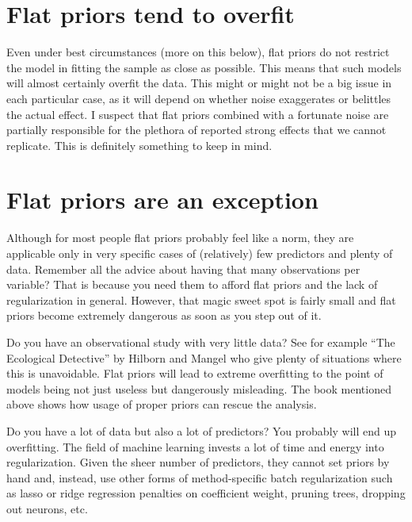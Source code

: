 \documentclass[
]{book}
\begin{document}
\hypertarget{flat-priors-tend-to-overfit}{%
\section{Flat priors tend to overfit}\label{flat-priors-tend-to-overfit}}

Even under best circumstances (more on this below), flat priors do not restrict the model in fitting the sample as close as possible. This means that such models will almost certainly overfit the data. This might or might not be a big issue in each particular case, as it will depend on whether noise exaggerates or belittles the actual effect. I suspect that flat priors combined with a fortunate noise are partially responsible for the plethora of reported strong effects that we cannot replicate. This is definitely something to keep in mind.

\hypertarget{flat-priors-are-an-exception}{%
\section{Flat priors are an exception}\label{flat-priors-are-an-exception}}

Although for most people flat priors probably feel like a norm, they are applicable only in very specific cases of (relatively) few predictors and plenty of data. Remember all the advice about having that many observations per variable? That is because you need them to afford flat priors and the lack of regularization in general. However, that magic sweet spot is fairly small and flat priors become extremely dangerous as soon as you step out of it.

Do you have an observational study with very little data? See for example ``The Ecological Detective'' by Hilborn and Mangel who give plenty of situations where this is unavoidable.
Flat priors will lead to extreme overfitting to the point of models being not just useless but dangerously misleading. The book mentioned above shows how usage of proper priors can rescue the analysis.

Do you have a lot of data but also a lot of predictors? You probably will end up overfitting. The field of machine learning invests a lot of time and energy into regularization. Given the sheer number of predictors, they cannot set priors by hand and, instead, use other forms of method-specific batch regularization such as lasso or ridge regression penalties on coefficient weight, pruning trees, dropping out neurons, etc.
\end{document}
